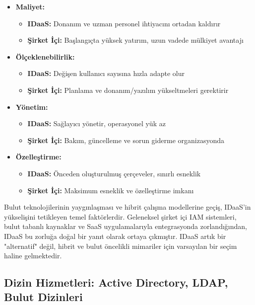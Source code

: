 \begin{itemize}
    \item \textbf{Maliyet:}
    \begin{itemize}
        \item \textbf{IDaaS:} Donanım ve uzman personel ihtiyacını ortadan kaldırır
        \item \textbf{Şirket İçi:} Başlangıçta yüksek yatırım, uzun vadede mülkiyet avantajı
    \end{itemize}
    
    \item \textbf{Ölçeklenebilirlik:}
    \begin{itemize}
        \item \textbf{IDaaS:} Değişen kullanıcı sayısına hızla adapte olur
        \item \textbf{Şirket İçi:} Planlama ve donanım/yazılım yükseltmeleri gerektirir
    \end{itemize}
    
    \item \textbf{Yönetim:}
    \begin{itemize}
        \item \textbf{IDaaS:} Sağlayıcı yönetir, operasyonel yük az
        \item \textbf{Şirket İçi:} Bakım, güncelleme ve sorun giderme organizasyonda
    \end{itemize}
    
    \item \textbf{Özelleştirme:}
    \begin{itemize}
        \item \textbf{IDaaS:} Önceden oluşturulmuş çerçeveler, sınırlı esneklik
        \item \textbf{Şirket İçi:} Maksimum esneklik ve özelleştirme imkanı
    \end{itemize}
\end{itemize}

Bulut teknolojilerinin yaygınlaşması ve hibrit çalışma modellerine geçiş, IDaaS'in yükselişini tetikleyen temel faktörlerdir. Geleneksel şirket içi IAM sistemleri, bulut tabanlı kaynaklar ve SaaS uygulamalarıyla entegrasyonda zorlandığından, IDaaS bu zorluğa doğal bir yanıt olarak ortaya çıkmıştır. IDaaS artık bir "alternatif" değil, hibrit ve bulut öncelikli mimariler için varsayılan bir seçim haline gelmektedir.

\subsection{Dizin Hizmetleri: Active Directory, LDAP, Bulut Dizinleri}

